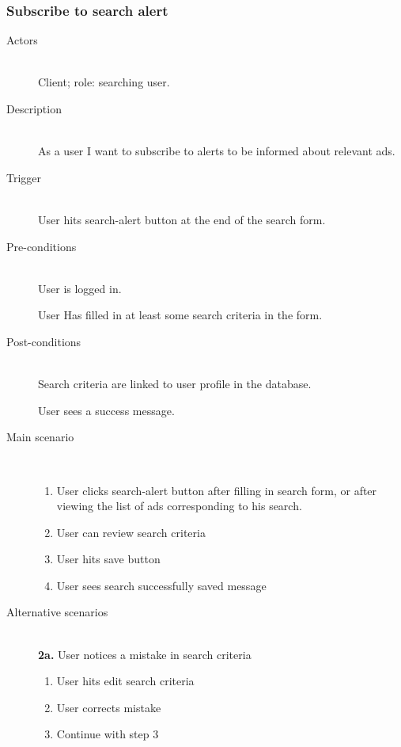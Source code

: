 \documentclass[a4wide]{article}
\begin{document}
\subsubsection{Subscribe to search alert}
\begin{description}
\item[Actors]\mbox{}\\
Client; role: searching user.
\item[Description]\mbox{}\\
As a user I want to subscribe to alerts to be informed about relevant ads.
\item[Trigger]\mbox{}\\
User hits search-alert button at the end of the search form.
\item[Pre-conditions]\mbox{}\\
User is logged in.

User Has filled in at least some search criteria in the form.
\item[Post-conditions]\mbox{}\\
Search criteria are linked to user profile in the database. 

User sees a success message.
\item[Main scenario]\mbox{}\\
\begin{enumerate}
\item User clicks search-alert button after filling in search form, or after viewing the list of ads corresponding to his search.
\item User can review search criteria
\item User hits save button
\item User sees search successfully saved message
\end{enumerate}
\item[Alternative scenarios]\mbox{}\\
\textbf{2a.} User notices a mistake in search criteria
\begin{enumerate}
\item User hits edit search criteria
\item User corrects mistake
\item Continue with step 3
\end{enumerate}
\end{description}
\end{document}
